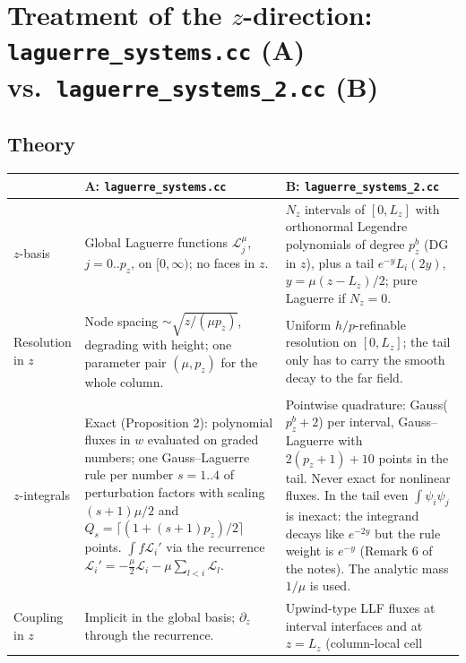 \documentclass[11pt,a4paper]{article}
\newcommand{\Lag}{\mathscr{L}}
\newcommand{\code}[1]{\texttt{#1}}
\begin{document}
\section[Treatment of the z-direction: A vs. B]{Treatment of the $z$-direction:\\ \code{laguerre\_systems.cc} (A) vs.\ \code{laguerre\_systems\_2.cc} (B)}

\subsection{Theory}

\begin{center}
\small
\begin{tabularx}{\textwidth}{@{}>{\raggedright\arraybackslash}p{2.6cm}>{\raggedright\arraybackslash}X>{\raggedright\arraybackslash}X@{}}
\toprule
& \textbf{A: \code{laguerre\_systems.cc}} & \textbf{B: \code{laguerre\_systems\_2.cc}}\\
\midrule
$z$-basis & Global Laguerre functions $\Lag^\mu_j$, $j=0..p_z$, on $[0,\infty)$; no faces in $z$. &
  $N_z$ intervals of $[0,L_z]$ with orthonormal Legendre polynomials of degree $p^b_z$
  (DG in $z$), plus a tail $e^{-y}L_i(2y)$, $y=\mu(z-L_z)/2$; pure Laguerre if $N_z=0$.\\
Resolution in $z$ & Node spacing $\sim\sqrt{z/(\mu p_z)}$, degrading with height;
  one parameter pair $(\mu,p_z)$ for the whole column. &
  Uniform $h/p$-refinable resolution on $[0,L_z]$; the tail only has to carry the
  smooth decay to the far field.\\
$z$-integrals & Exact (Proposition 2): polynomial fluxes in $w$ evaluated on graded
  numbers; one Gauss--Laguerre rule per number $s=1..4$ of perturbation factors with
  scaling $(s+1)\mu/2$ and $Q_s=\lceil(1+(s+1)p_z)/2\rceil$ points. $\int f\Lag_i'$
  via the recurrence $\Lag_i'=-\frac\mu2\Lag_i-\mu\sum_{l<i}\Lag_l$. &
  Pointwise quadrature: Gauss($p^b_z+2$) per interval, Gauss--Laguerre with
  $2(p_z+1)+10$ points in the tail. Never exact for nonlinear fluxes. In the tail even
  $\int\psi_i\psi_j$ is inexact: the integrand decays like $e^{-2y}$ but the rule
  weight is $e^{-y}$ (Remark 6 of the notes). The analytic mass $1/\mu$ is used.\\
Coupling in $z$ & Implicit in the global basis; $\partial_z$ through the recurrence. &
  Upwind-type LLF fluxes at interval interfaces and at $z=L_z$ (column-local cell

\end{tabularx}
\end{center}
\end{document}
